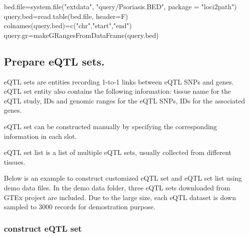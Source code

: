 \documentclass[]{article}
\newcommand{\hlstr}[1]{\textcolor[rgb]{0.251,0.627,0.251}{#1}}%
\newcommand{\hlstd}[1]{\textcolor[rgb]{0.251,0.251,0.251}{#1}}%
\newcommand{\hlkwc}[1]{\textcolor[rgb]{0.251,0.251,0.251}{#1}}%
\newcommand{\hlkwd}[1]{\textcolor[rgb]{0.878,0.439,0.125}{#1}}%
\newenvironment{Shaded}{\begin{myshaded}}{\end{myshaded}}
\newcommand{\KeywordTok}[1]{\hlkwd{#1}}
\newcommand{\DataTypeTok}[1]{\hlkwc{#1}}
\newcommand{\StringTok}[1]{\hlstr{#1}}
\newcommand{\NormalTok}[1]{\hlstd{#1}}
\theoremstyle{definition}
\theoremstyle{definition}
\theoremstyle{remark}
\begin{document}
\begin{Shaded}
\begin{Highlighting}[]
\NormalTok{bed.file=}\KeywordTok{system.file}\NormalTok{(}\StringTok{"extdata"}\NormalTok{, }\StringTok{"query/Psoriasis.BED"}\NormalTok{, }\DataTypeTok{package =} \StringTok{"loci2path"}\NormalTok{)}
\NormalTok{query.bed=}\KeywordTok{read.table}\NormalTok{(bed.file, }\DataTypeTok{header=}\NormalTok{F)}
\KeywordTok{colnames}\NormalTok{(query.bed)=}\KeywordTok{c}\NormalTok{(}\StringTok{"chr"}\NormalTok{,}\StringTok{"start"}\NormalTok{,}\StringTok{"end"}\NormalTok{)}
\NormalTok{query.gr=}\KeywordTok{makeGRangesFromDataFrame}\NormalTok{(query.bed)}
\end{Highlighting}
\end{Shaded}

\subsection{Prepare eQTL sets.}\label{prepare-eqtl-sets.}

eQTL sets are entities recording 1-to-1 links between eQTL SNPs and
genes. eQTL set entity also contains the following information: tissue
name for the eQTL study, IDs and genomic ranges for the eQTL SNPs, IDs
for the associated genes.

eQTL set can be constructed manually by specifying the corresponding
information in each slot.

eQTL set list is a list of multiple eQTL sets, usually collected from
different tissues.

Below is an example to construct customized eQTL set and eQTL set list
using demo data files. In the demo data folder, three eQTL sets
downloaded from GTEx project are included. Due to the large size, each
eQTL dataset is down sampled to 3000 records for demostration purpose.

\subsubsection{construct eQTL set}\label{construct-eqtl-set}
\end{document}
